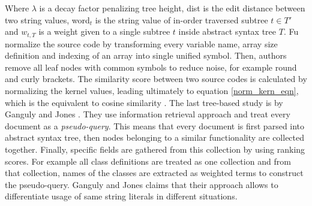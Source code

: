 \noindent
Where $\lambda$ is a decay factor penalizing tree height, dist is the edit distance between two string values, word$_t$ is the string value of in-order traversed subtree $t \in T'$ and $w_{t, T}$ is a weight given to a single subtree $t$ inside abstract syntax tree $T$. Fu \etal normalize the source code by transforming every variable name, array size definition and indexing of an array into single unified symbol. Then, authors remove all leaf nodes with common symbols to reduce noise, for example round and curly brackets. The similarity score between two source codes is calculated by normalizing the kernel values, leading ultimately to equation \ref{norm_kern_eqn}, which is the equivalent to cosine similarity \cite{Fu2017WASTKAW}. The last tree-based study is by Ganguly and Jones \cite{AIR2015}. They use information retrieval approach and treat every document as a \emph{pseudo-query}. This means that every document is first parsed into abstract syntax tree, then nodes belonging to a similar functionality are collected together. Finally, specific fields are gathered from this collection by using ranking scores. For example all class definitions are treated as one collection and from that collection, names of the classes are extracted as weighted terms to construct the pseudo-query. Ganguly and Jones claims that their approach allows to differentiate usage of same string literals in different situations.

